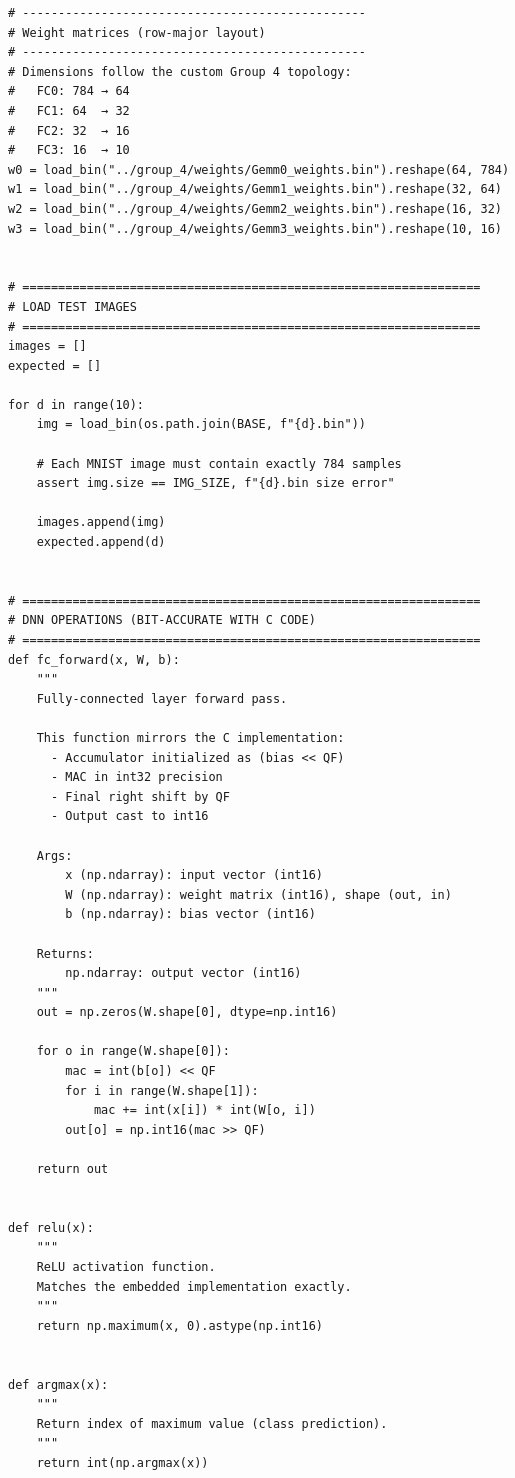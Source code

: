 \begin{lstlisting}
# ------------------------------------------------
# Weight matrices (row-major layout)
# ------------------------------------------------
# Dimensions follow the custom Group 4 topology:
#   FC0: 784 → 64
#   FC1: 64  → 32
#   FC2: 32  → 16
#   FC3: 16  → 10
w0 = load_bin("../group_4/weights/Gemm0_weights.bin").reshape(64, 784)
w1 = load_bin("../group_4/weights/Gemm1_weights.bin").reshape(32, 64)
w2 = load_bin("../group_4/weights/Gemm2_weights.bin").reshape(16, 32)
w3 = load_bin("../group_4/weights/Gemm3_weights.bin").reshape(10, 16)


# ================================================================
# LOAD TEST IMAGES
# ================================================================
images = []
expected = []

for d in range(10):
    img = load_bin(os.path.join(BASE, f"{d}.bin"))

    # Each MNIST image must contain exactly 784 samples
    assert img.size == IMG_SIZE, f"{d}.bin size error"

    images.append(img)
    expected.append(d)


# ================================================================
# DNN OPERATIONS (BIT-ACCURATE WITH C CODE)
# ================================================================
def fc_forward(x, W, b):
    """
    Fully-connected layer forward pass.

    This function mirrors the C implementation:
      - Accumulator initialized as (bias << QF)
      - MAC in int32 precision
      - Final right shift by QF
      - Output cast to int16

    Args:
        x (np.ndarray): input vector (int16)
        W (np.ndarray): weight matrix (int16), shape (out, in)
        b (np.ndarray): bias vector (int16)

    Returns:
        np.ndarray: output vector (int16)
    """
    out = np.zeros(W.shape[0], dtype=np.int16)

    for o in range(W.shape[0]):
        mac = int(b[o]) << QF
        for i in range(W.shape[1]):
            mac += int(x[i]) * int(W[o, i])
        out[o] = np.int16(mac >> QF)

    return out


def relu(x):
    """
    ReLU activation function.
    Matches the embedded implementation exactly.
    """
    return np.maximum(x, 0).astype(np.int16)


def argmax(x):
    """
    Return index of maximum value (class prediction).
    """
    return int(np.argmax(x))



\end{lstlisting}
